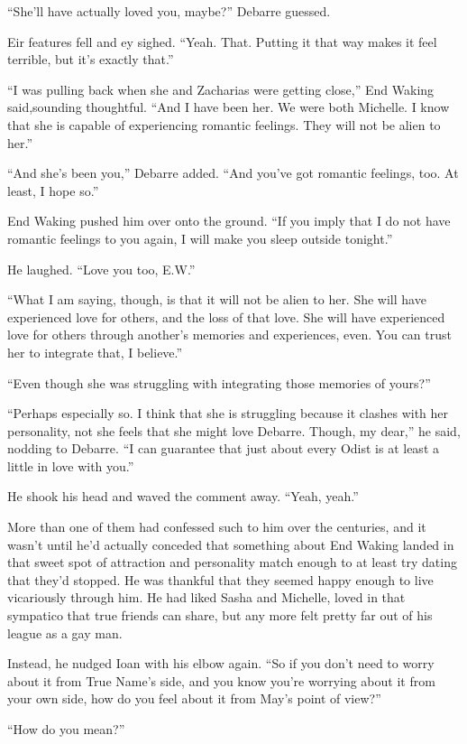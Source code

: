 ``She'll have actually loved you, maybe?'' Debarre guessed.

Eir features fell and ey sighed. ``Yeah. That. Putting it that way makes it feel terrible, but it's exactly that.''

``I was pulling back when she and Zacharias were getting close,'' End Waking said,sounding thoughtful. ``And I have been her. We were both Michelle. I know that she is capable of experiencing romantic feelings. They will not be alien to her.''

``And she's been you,'' Debarre added. ``And you've got romantic feelings, too. At least, I hope so.''

End Waking pushed him over onto the ground. ``If you imply that I do not have romantic feelings to you again, I will make you sleep outside tonight.''

He laughed. ``Love you too, E.W.''

``What I am saying, though, is that it will not be alien to her. She will have experienced love for others, and the loss of that love. She will have experienced love for others through another's memories and experiences, even. You can trust her to integrate that, I believe.''

``Even though she was struggling with integrating those memories of yours?''

``Perhaps especially so. I think that she is struggling because it clashes with her personality, not she feels that she might love Debarre. Though, my dear,'' he said, nodding to Debarre. ``I can guarantee that just about every Odist is at least a little in love with you.''

He shook his head and waved the comment away. ``Yeah, yeah.''

More than one of them had confessed such to him over the centuries, and it wasn't until he'd actually conceded that something about End Waking landed in that sweet spot of attraction and personality match enough to at least try dating that they'd stopped. He was thankful that they seemed happy enough to live vicariously through him. He had liked Sasha and Michelle, loved in that sympatico that true friends can share, but any more felt pretty far out of his league as a gay man.

Instead, he nudged Ioan with his elbow again. ``So if you don't need to worry about it from True Name's side, and you know you're worrying about it from your own side, how do you feel about it from May's point of view?''

``How do you mean?''

